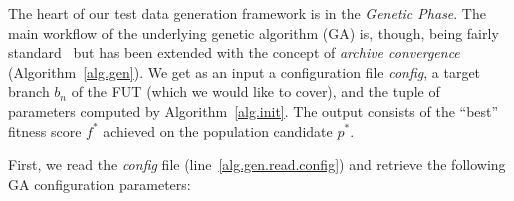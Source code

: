 \documentclass[sigconf]{acmart}
\begin{document}
The heart of our test data generation framework is in the \emph{Genetic Phase}. The main workflow of the underlying genetic algorithm (GA) is, though, being fairly standard~\cite{poli2008field} but has been extended with the concept of \emph{archive convergence} (Algorithm~\ref{alg.gen}). We get as an input a configuration file \emph{config}, a target branch $b_n$ of the FUT (which we would like to cover), and the tuple of parameters computed by Algorithm~\ref{alg.init}. The output consists of the ``best'' fitness score $f^*$ achieved on the population candidate $p^*$.

First, we read the \emph{config} file (line~\ref{alg.gen.read.config}) and retrieve the following GA configuration parameters: 
\end{document}
